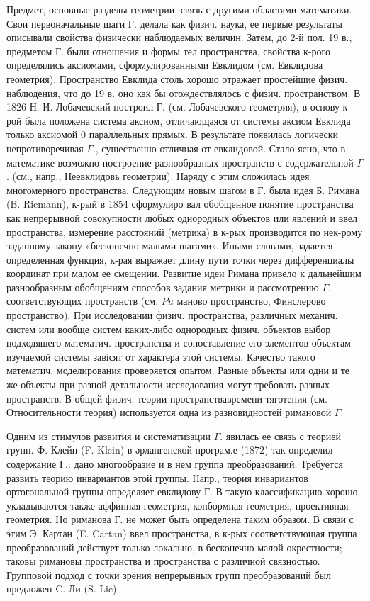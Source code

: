 \documentclass[10pt]{article}
\begin{document}
Предмет, основные разделы геометрии, связь с другими областями математики. Свои первоначальные шаги Г. делала как физич. наука, ее первые результаты описывали свойства физически наблюдаемых величин. Затем, до 2-й пол. 19 в., предметом Г. были отношения и формы тел пространства, свойства к-рого определялись аксиомами, сформулированными Евклидом (см. Евклидова геометрия). Пространство Евклида столь хорошо отражает простейшие физич. наблюдения, что до 19 в. оно как бы отождествлялось с физич. пространством. В 1826 Н. И. Лобачевский построил Г. (см. Лобачевского геометрия), в основу к-рой была положена система аксиом, отличающаяся от системы аксиом Евклида только аксиомой 0 параллельных прямых. В результате появилась логически непротиворечивая $\Gamma$., существенно отличная от евклидовой. Стало ясно, что в математике возможно построение разнообразных пространств с содержательной $\Gamma$. (см., напр., Неевклидовь геометрии). Наряду с этим сложилась идея многомерного пространства. Следующим новым шагом в Г. была идея Б. Римана (B. Ricmann), к-рый в 1854 сформулиро вал обобщенное понятие пространства как непрерывной совокупности любых однородных объектов или явлений и ввел пространства, измерение расстояний (метрика) в к-рых производится по нек-рому заданному закону «бесконечно малыми шагами». Иными словами, задается определенная функция, к-рая выражает длину пути точки через дифференциалы координат при малом ее смещении. Развитие идеи Римана привело к дальнейшим разнообразным обобщениям способов задания метрики и рассмотрению $\Gamma$. соответствующих пространств (см. $P u$ маново пространство, Финслерово пространство). При исследовании физич. пространства, различных механич. систем или вообще систем каких-либо однородных физич. объектов выбор подходящего математич. пространства и сопоставление его элементов объектам изучаемой системы завісят от характера этой системы. Качество такого математич. моделирования проверяется опытом. Разные объекты или одни и те же объекты при разной детальности исследования могут требовать разных пространств. В общей физич. теории пространствавремени-тяготения (см. Относительности теория) используется одна из разновидностей римановой $\Gamma$.



Одним из стимулов развития и систематизации $\Gamma$. явилась ее связь с теорией групп. Ф. Клейн (F. Klein) в әрлангенской програм.е (1872) так определил содержание Г.: дано многообразие и в нем группа преобразований. Требуется развить теорию инвариантов этой группы. Напр., теория инвариантов ортогональной группы определяет евклидову Г. В такую классификацию хорошо укладываются также аффинная геометрия, конбормная геометрия, проективная геометрия. Но риманова Г. не может быть определена таким образом. В связи с этим Э. Картан (E. Cartan) ввел пространства, в к-рых соответствующая группа преобразований действует только локально, в бесконечно малой окрестности; таковы римановы пространства и пространства с различной связностью. Групповой подход с точки зрения непрерывных групп преобразований был предложен C. Ли (S. Lie).
\end{document}
